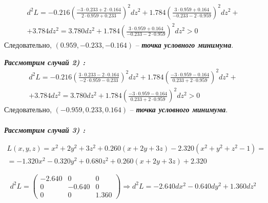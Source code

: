 \documentclass[a5paper, 10pt]{article}
\theoremstyle{definition}
\theoremstyle{plain}
\theoremstyle{remark}
\begin{document}
\begin{multline}
 d^2L = -0.216 \left( \frac{-3\cdot 0.233 +2 \cdot 0.164}{2\cdot 0.959 +0.233} \right)^ 2dz^ 2  + 1.784  \left( \frac{3\cdot 0.959 + 0.164}{-0.233 - 2\cdot 0.959}\right)^ 2dz^ 2  + \\
+ 3.784 dz^2 = 3.780 dz^2 + 1.784  \left( \frac{3\cdot 0.959 + 0.164}{-0.233 - 2\cdot 0.959}\right)^ 2dz^ 2 > 0
\end{multline}
Следовательно, $(0.959, -0.233, -0.164 )$ -- \textit{\textbf{точка условного минимума}}.



\newpage
\textit{\textbf{Рассмотрим случай 2) :}}
\begin{multline}
 d^2L = -0.216 \left( \frac{3\cdot 0.233 -2 \cdot 0.164}{-2\cdot 0.959 -0.233} \right)^ 2dz^ 2  + 1.784  \left( \frac{-3\cdot 0.959 - 0.164}{0.233 + 2\cdot 0.959}\right)^ 2dz^ 2  + \\
+ 3.784 dz^2 = 3.780 dz^2 + 1.784  \left( \frac{-3\cdot 0.959 - 0.164}{0.233 + 2\cdot 0.959}\right)^ 2dz^ 2 > 0
\end{multline}
Следовательно, $(-0.959, 0.233, 0.164 )$ -- \textit{\textbf{точка условного минимума}}.
\\
\\
\textit{\textbf{Рассмотрим случай 3) :}}




\begin{multline}
L(x, y, z) = x^2+2y^2+3z^2  + 0.260  \left(  x + 2y+3z \right) - 2.320 \left( x^2 +y^2+z^2 - 1   \right) = \\
= -1.320 x^2 - 0.320 y^2 +  0.680 z^2 + 0.260  \left(  x + 2y+3z \right)  + 2.320
\end{multline}

\begin{equation}
d^2L = 
\begin{pmatrix}
-2.640 & 0 & 0\\
0 & -0.640 & 0\\
0 & 0 & 1.360
\end{pmatrix}
\Rightarrow d^2L = -2.640 d x^ 2 -0.640 dy^2 + 1.360 dz^2
\end{equation}
\end{document}
